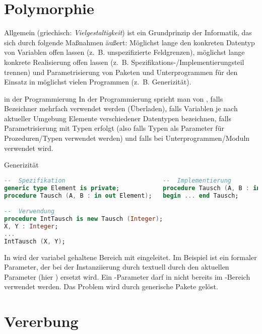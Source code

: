 \section{%
    Polymorphie%
}

\begin{Def}{Allgemein}
     (griechisch: \emph{Vielgestaltigkeit}) ist ein
    Grundprinzip der Informatik, das sich durch folgende Maßnahmen äußert:
    Möglichst lange den konkreten Datentyp von Variablen offen lassen
    (z.~B. unspezifizierte Feldgrenzen), möglichst lange konkrete
    Realisierung offen lassen (z.~B. Spezifikations-/Implementierungsteil
    trennen) und Parametrisierung von Paketen und Unterprogrammen für den
    Einsatz in möglichst vielen Programmen (z.~B. Generizität).
\end{Def}

\begin{Def}{in der Programmierung}
    In der Programmierung spricht man von , falls
    Bezeichner mehrfach verwendet werden (Überladen), falls
    Variablen je nach aktueller Umgebung Elemente verschiedener Datentypen
    bezeichnen, falls Parametrisierung mit Typen erfolgt (also falls Typen als
    Parameter für Prozeduren/Typen verwendet werden) und falls
     bei Unterprogrammen/Moduln verwendet wird.
\end{Def}

\begin{Def}{Generizität}
\begin{lstlisting}[language=ada]
--  Spezifikation                           --  Implementierung
generic type Element is private;            procedure Tausch (A, B : in out Element) is ...
procedure Tausch (A, B : in out Element);   begin ... end Tausch;

--  Verwendung
procedure IntTausch is new Tausch (Integer);
X, Y : Integer;
...
IntTausch (X, Y);
\end{lstlisting}
    In \Ada{} wird der variabel gehaltene Bereich mit 
    eingeleitet.
    Im Beispiel ist  ein formaler Parameter, der bei der
    Instanziierung durch  textuell durch den aktuellen
    Parameter (hier ) ersetzt wird.
    Ein -Parameter darf in \Ada{} nicht bereits im
    -Bereich verwendet werden.
    Das Problem wird durch generische Pakete gelöst.
\end{Def}

\section{%
    Vererbung%
}


